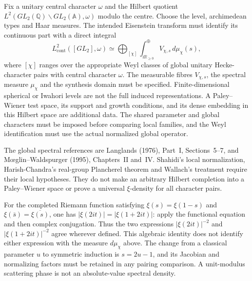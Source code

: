 \begin{conjecture}
\label{v4-arith:w6-d:thm:PW-synthesis}
Fix a unitary central character $\omega$ and the Hilbert quotient
$L^2(GL_2(\mathbb Q)\backslash GL_2(\mathbb A),\omega)$ modulo
the centre. Choose the level, archimedean types and Haar measures.
The intended Eisenstein transform must identify its continuous part
with a direct integral
\begin{equation}
\label{v4-arith:w6-d:eq:PW-iso}
 L^2_{\mathrm{cont}}([GL_2],\omega)
 \simeq\bigoplus_{[\chi]}\int_{i\mathbb R_{\ge0}}^\oplus
 V_{\chi,s}\,d\mu_\chi(s),
\end{equation}
where $[\chi]$ ranges over the appropriate Weyl classes of global
unitary Hecke-character pairs with central character $\omega$.
The measurable fibres $V_{\chi,s}$, the spectral measure $\mu_\chi$
and the synthesis domain must be specified. Finite-dimensional
spherical or Iwahori levels are not the full induced representations.
A Paley--Wiener test space, its support and growth conditions, and
its dense embedding in this Hilbert space are additional data.
The shared parameter and global characters must be imposed before
comparing local families, and the Weyl identification must use the
actual normalized global operator.
\end{conjecture}
The global spectral references are Langlands (1976), Part~I,
Sections~5--7, and M\oe glin--Waldspurger (1995), Chapters~II and~IV.
Shahidi's local normalization, Harish-Chandra's real-group Plancherel
theorem and Wallach's treatment require their local hypotheses.
They do not make an arbitrary Hilbert completion into a Paley--Wiener
space or prove a universal $\xi$-density for all character pairs.

\begin{remark}
\label{v4-arith:w6-d:rem:plancherel-density}
For the completed Riemann function satisfying
$\xi(s)=\xi(1-s)$ and $\xi(\bar s)=\overline{\xi(s)}$, one has
$|\xi(2it)|=|\xi(1+2it)|$: apply the functional equation and then
complex conjugation. Thus the two expressions
$|\xi(2it)|^{-2}$ and $|\xi(1+2it)|^{-2}$ agree wherever defined.
This algebraic identity does not identify either expression with the
measure $d\mu_\chi$ above. The change from a classical parameter $u$
to symmetric induction is $s=2u-1$, and its Jacobian and normalizing
factors must be retained in any pairing comparison. A unit-modulus
scattering phase is not an absolute-value spectral density.
\end{remark}

